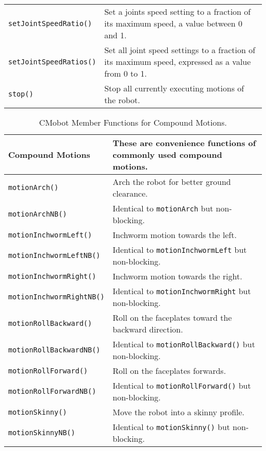 \begin{table}[!h]
\begin{center}
\begin{tabular}{p{38 mm}p{110 mm}}
\texttt{setJointSpeedRatio()} & Set a joints speed setting to a fraction of its maximum speed, a value between 0 and 1. \\
\texttt{setJointSpeedRatios()} & Set all joint speed settings to a fraction of its
maximum speed, expressed as a value from 0 to 1. \\
\texttt{stop()} & Stop all currently executing motions of the robot. \\
\hline
\end{tabular}
\end{center}
\label{mobilec_api_cbinary}
\end{table}

\begin{table}[!h]
\begin{center}
\caption{CMobot Member Functions for Compound Motions.}
\begin{tabular}{p{38 mm}p{107 mm}}
Compound Motions & These are convenience functions of commonly used compound motions. \\
\hline
\texttt{motionArch()} \dotfill & Arch the robot for better ground clearance. \\
\texttt{motionArchNB()} \dotfill & Identical to \texttt{motionArch} but non-blocking. \\
\texttt{motionInchwormLeft()} \dotfill & Inchworm motion towards the left. \\
\texttt{motionInchwormLeftNB()} \dotfill & Identical to \texttt{motionInchwormLeft} but non-blocking. \\
\texttt{motionInchwormRight()} \dotfill & Inchworm motion towards the right. \\
\texttt{motionInchwormRightNB()} \dotfill & Identical to \texttt{motionInchwormRight} but non-blocking. \\
\texttt{motionRollBackward()} \dotfill & Roll on the faceplates toward the backward direction. \\
\texttt{motionRollBackwardNB()} \dotfill & Identical to \texttt{motionRollBackward()} but non-blocking. \\
\texttt{motionRollForward()} \dotfill & Roll on the faceplates forwards. \\
\texttt{motionRollForwardNB()} \dotfill & Identical to \texttt{motionRollForward()} but non-blocking. \\
\texttt{motionSkinny()} \dotfill & Move the robot into a skinny profile. \\
\texttt{motionSkinnyNB()} \dotfill & Identical to \texttt{motionSkinny()} but non-blocking. \\

\end{tabular}
\end{center}
\end{table}
